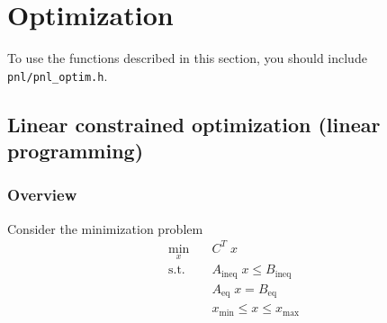 \section{Optimization}

To use the functions described in this section, you should include \verb!pnl/pnl_optim.h!.

\subsection{Linear constrained optimization (linear programming)}

\subsubsection{Overview}

Consider the minimization problem
\begin{align*}
  \min_x \quad & C^T \; x \\
  \mbox{s.t.} \quad & 
  A_{\text{ineq}} \; x \le B_{\text{ineq}}\\
  &A_{\text{eq}} \; x = B_{\text{eq}}\\
  & x_{\text{min}} \le x \le x_{\text{max}}
\end{align*}

